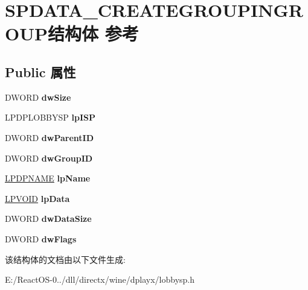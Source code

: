 \hypertarget{struct_s_p_d_a_t_a___c_r_e_a_t_e_g_r_o_u_p_i_n_g_r_o_u_p}{}\section{S\+P\+D\+A\+T\+A\+\_\+\+C\+R\+E\+A\+T\+E\+G\+R\+O\+U\+P\+I\+N\+G\+R\+O\+U\+P结构体 参考}
\label{struct_s_p_d_a_t_a___c_r_e_a_t_e_g_r_o_u_p_i_n_g_r_o_u_p}
\subsection*{Public 属性}
\begin{DoxyCompactItemize}
\item 
\mbox{\label{struct_s_p_d_a_t_a___c_r_e_a_t_e_g_r_o_u_p_i_n_g_r_o_u_p_a8961fc815cc3ef0ad8260eb554e91794}} 
D\+W\+O\+RD {\bfseries dw\+Size}
\item 
\mbox{\label{struct_s_p_d_a_t_a___c_r_e_a_t_e_g_r_o_u_p_i_n_g_r_o_u_p_aa8a7775c6cc0b7e5f8345b82ceb9f576}} 
L\+P\+D\+P\+L\+O\+B\+B\+Y\+SP {\bfseries lp\+I\+SP}
\item 
\mbox{\label{struct_s_p_d_a_t_a___c_r_e_a_t_e_g_r_o_u_p_i_n_g_r_o_u_p_a6067f9f1e9e9a3a529d44e3459a0b28e}} 
D\+W\+O\+RD {\bfseries dw\+Parent\+ID}
\item 
\mbox{\label{struct_s_p_d_a_t_a___c_r_e_a_t_e_g_r_o_u_p_i_n_g_r_o_u_p_aec1613677be357cdd094c6e6cdb3e4f9}} 
D\+W\+O\+RD {\bfseries dw\+Group\+ID}
\item 
\mbox{\label{struct_s_p_d_a_t_a___c_r_e_a_t_e_g_r_o_u_p_i_n_g_r_o_u_p_a7ad318d6c6fe6f92a24c5b7083e34adc}} 
\hyperlink{structtag_d_p_n_a_m_e}{L\+P\+D\+P\+N\+A\+ME} {\bfseries lp\+Name}
\item 
\mbox{\label{struct_s_p_d_a_t_a___c_r_e_a_t_e_g_r_o_u_p_i_n_g_r_o_u_p_a683b5dcfcd9c85925944d3deb2ce6dcb}} 
\hyperlink{interfacevoid}{L\+P\+V\+O\+ID} {\bfseries lp\+Data}
\item 
\mbox{\label{struct_s_p_d_a_t_a___c_r_e_a_t_e_g_r_o_u_p_i_n_g_r_o_u_p_a1c3f23560154feb299f007e277661883}} 
D\+W\+O\+RD {\bfseries dw\+Data\+Size}
\item 
\mbox{\label{struct_s_p_d_a_t_a___c_r_e_a_t_e_g_r_o_u_p_i_n_g_r_o_u_p_ab92a28fb6772d6eac7e7c20144e13bd3}} 
D\+W\+O\+RD {\bfseries dw\+Flags}
\end{DoxyCompactItemize}


该结构体的文档由以下文件生成\+:\begin{DoxyCompactItemize}
\item 
E\+:/\+React\+O\+S-\/0../dll/directx/wine/dplayx/lobbysp.\+h\end{DoxyCompactItemize}
